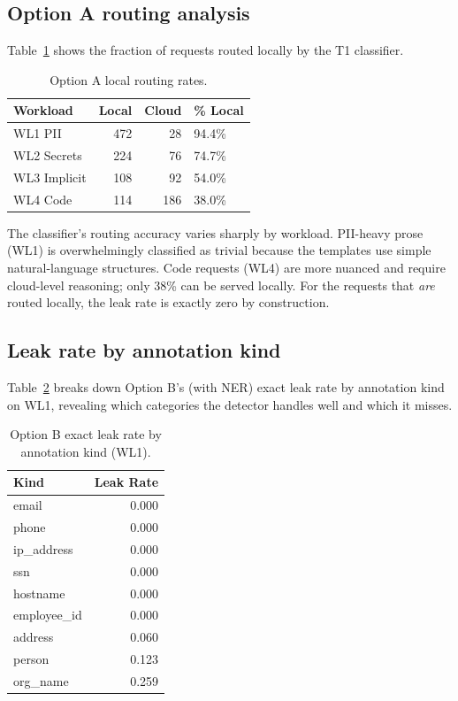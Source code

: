 \documentclass[11pt,a4paper]{article}
\begin{document}
\subsection{Option A routing analysis}

Table~\ref{tab:routing} shows the fraction of requests routed
locally by the T1 classifier.

\begin{table}[h]
\centering
\small
\caption{Option A local routing rates.}
\label{tab:routing}
\begin{tabular}{lrrl}
\toprule
Workload & Local & Cloud & \% Local \\
\midrule
WL1 PII      & 472 & 28  & 94.4\% \\
WL2 Secrets  & 224 & 76  & 74.7\% \\
WL3 Implicit & 108 & 92  & 54.0\% \\
WL4 Code     & 114 & 186 & 38.0\% \\
\bottomrule
\end{tabular}
\end{table}

The classifier's routing accuracy varies sharply by workload.
PII-heavy prose (WL1) is overwhelmingly classified as trivial
because the templates use simple natural-language structures.
Code requests (WL4) are more nuanced and require cloud-level
reasoning; only 38\% can be served locally.  For the requests
that \emph{are} routed locally, the leak rate is exactly zero
by construction.

\subsection{Leak rate by annotation kind}

Table~\ref{tab:leak-kind} breaks down Option B's (with NER)
exact leak rate by annotation kind on WL1, revealing which
categories the detector handles well and which it misses.

\begin{table}[h]
\centering
\small
\caption{Option B exact leak rate by annotation kind (WL1).}
\label{tab:leak-kind}
\begin{tabular}{lr}
\toprule
Kind & Leak Rate \\
\midrule
email        & 0.000 \\
phone        & 0.000 \\
ip\_address  & 0.000 \\
ssn          & 0.000 \\
hostname     & 0.000 \\
employee\_id & 0.000 \\
address      & 0.060 \\
person       & 0.123 \\
org\_name    & 0.259 \\
\bottomrule
\end{tabular}
\end{table}
\end{document}
